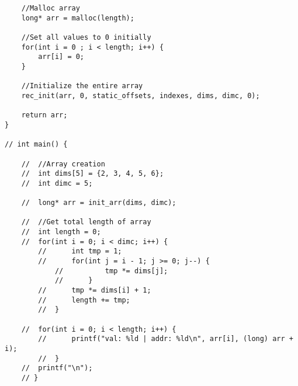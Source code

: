 \begin{verbatim}
	//Malloc array
	long* arr = malloc(length);
	
	//Set all values to 0 initially
	for(int i = 0 ; i < length; i++) {
		arr[i] = 0;
	}
	
	//Initialize the entire array
	rec_init(arr, 0, static_offsets, indexes, dims, dimc, 0);
	
	return arr;
}

// int main() {
	
	// 	//Array creation
	// 	int dims[5] = {2, 3, 4, 5, 6};
	// 	int dimc = 5;
	
	// 	long* arr = init_arr(dims, dimc);
	
	// 	//Get total length of array
	// 	int length = 0;
	// 	for(int i = 0; i < dimc; i++) {
		// 		int tmp = 1;
		// 		for(int j = i - 1; j >= 0; j--) {
			// 			tmp *= dims[j];
			// 		}
		// 		tmp *= dims[i] + 1;
		// 		length += tmp;
		// 	}
	
	// 	for(int i = 0; i < length; i++) {
		// 		printf("val: %ld | addr: %ld\n", arr[i], (long) arr + i);
		// 	}
	// 	printf("\n");
	// }
\end{verbatim}	